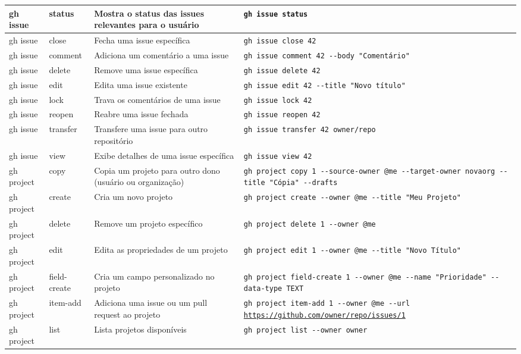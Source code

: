 \begin{longtable}{|p{2cm}|p{2.3cm}|p{4cm}|p{6cm}|}
    \hline
    gh issue & status & Mostra o status das issues relevantes para o usuário & \texttt{gh issue status} \\
    \hline
    gh issue & close & Fecha uma issue específica & \texttt{gh issue close 42} \\
    \hline
    gh issue & comment & Adiciona um comentário a uma issue & \texttt{gh issue comment 42 -{-}body "Comentário"} \\
    \hline
    gh issue & delete & Remove uma issue específica & \texttt{gh issue delete 42} \\
    \hline
    gh issue & edit & Edita uma issue existente & \texttt{gh issue edit 42 -{-}title "Novo título"} \\
    \hline
    gh issue & lock & Trava os comentários de uma issue & \texttt{gh issue lock 42} \\
    \hline
    gh issue & reopen & Reabre uma issue fechada & \texttt{gh issue reopen 42} \\
    \hline
    gh issue & transfer & Transfere uma issue para outro repositório & \texttt{gh issue transfer 42 owner/repo} \\
    \hline
    gh issue & view & Exibe detalhes de uma issue específica & \texttt{gh issue view 42} \\
    \hline
    gh project & copy & Copia um projeto para outro dono (usuário ou organização) & \texttt{gh project copy 1 -{-}source-owner @me -{-}target-owner novaorg -{-}title "Cópia" -{-}drafts} \\
    \hline
    gh project & create & Cria um novo projeto & \texttt{gh project create -{-}owner @me -{-}title "Meu Projeto"} \\
    \hline
    gh project & delete & Remove um projeto específico & \texttt{gh project delete 1 -{-}owner @me} \\
    \hline
    gh project & edit & Edita as propriedades de um projeto & \texttt{gh project edit 1 -{-}owner @me -{-}title "Novo Título"} \\
    \hline
    gh project & field-create & Cria um campo personalizado no projeto & \texttt{gh project field-create 1 -{-}owner @me -{-}name "Prioridade" -{-}data-type TEXT} \\
    \hline
    gh project & item-add & Adiciona uma issue ou um pull request ao projeto & \texttt{gh project item-add 1 -{-}owner @me -{-}url \url{https://github.com/owner/repo/issues/1}} \\
    \hline
    gh project & list & Lista projetos disponíveis & \texttt{gh project list -{-}owner owner} \\

\end{longtable}
